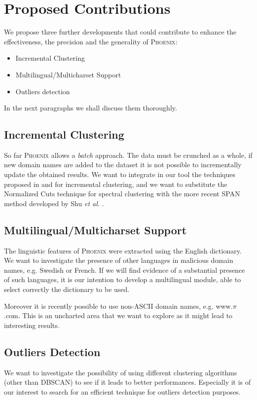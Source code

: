 \section{Proposed Contributions}
\label{sec:proposed_approach}
We propose three further developments that could contribute to enhance the
effectiveness, the precision and the generality of \textsc{Phoenix}:
\begin{itemize}
  \item Incremental Clustering
  \item Multilingual/Multicharset Support
  \item Outliers detection
\end{itemize}
In the next paragraphs we shall discuss them thoroughly.

\subsection{Incremental Clustering} %
\label{sub:incremental_clustering}
So far \textsc{Phoenix} allows a \emph{batch} approach. The data must be crunched as
a whole, if new domain names are added to the dataset it is not possible to incrementally
update the obtained results. We want to integrate in our tool the techniques proposed in
\cite{Ning2010} and \cite{Chi2009} for incremental clustering, and we want to
substitute the Normalized Cuts technique for spectral clustering \cite{Shi2000} with
the more recent SPAN method developed by Shu \emph{et al.} \cite{Shu2011}.


\subsection{Multilingual/Multicharset Support} %
\label{sub:multilingual_multicharset_support}
The linguistic features of \textsc{Phoenix} were extracted using the English
dictionary. We want to investigate the presence of other languages in malicious
domain names, e.g. Swedish or French. If we will find evidence of a substantial
presence of such languages, it is our intention to develop a multilingual module,
able to select correctly the dictionary to be used.

Moreover it is recently possible to use non-ASCII domain names, e.g.
www.$\pi$.com. This is an uncharted area that we want to explore as it might lead
to interesting results.


\subsection{Outliers Detection} %
\label{sub:outliers_detection}
We want to investigate the possibility of using different clustering algorithms
(other than DBSCAN) to see if it leads to better performances. Especially it is of
our interest to search for an efficient technique for outliers detection purposes.


